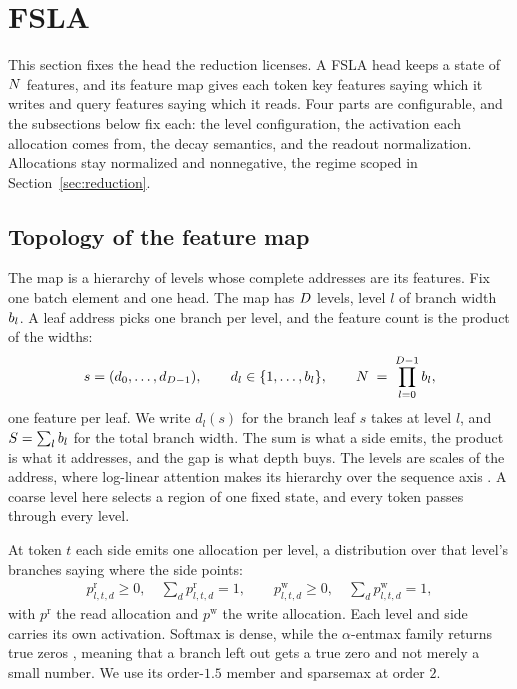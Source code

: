 \section{FSLA}
\label{sec:fsla}

This section fixes the head the reduction licenses. A FSLA head keeps a state of $N$ features, and its feature map gives each token key features saying which it writes and query features saying which it reads. Four parts are configurable, and the subsections below fix each: the level configuration, the activation each allocation comes from, the decay semantics, and the readout normalization. Allocations stay normalized and nonnegative, the regime scoped in Section~\ref{sec:reduction}.

\subsection{Topology of the feature map}
\label{sec:topology}

The map is a hierarchy of levels whose complete addresses are its features. Fix one batch element and one head. The map has $D$ levels, level $l$ of branch width $b_l$. A leaf address picks one branch per level, and the feature count is the product of the widths:
\begin{align}
  s = (d_0, \dots, d_{D-1}), \qquad d_l \in \{1,\dots,b_l\},
  \qquad N \;=\; \prod_{l=0}^{D-1} b_l ,
  \label{eq:leafcount}
\end{align}
one feature per leaf. We write $d_l(s)$ for the branch leaf $s$ takes at level $l$, and $S = \sum_l b_l$ for the total branch width. The sum is what a side emits, the product is what it addresses, and the gap is what depth buys. The levels are scales of the address, where log-linear attention makes its hierarchy over the sequence axis \citep{guo2025loglinear}. A coarse level here selects a region of one fixed state, and every token passes through every level.

At token $t$ each side emits one allocation per level, a distribution over that level's branches saying where the side points:
\begin{align}
  p^{\mathrm{r}}_{l,t,d} \ge 0,\quad \textstyle\sum_d p^{\mathrm{r}}_{l,t,d} = 1,
  \qquad
  p^{\mathrm{w}}_{l,t,d} \ge 0,\quad \textstyle\sum_d p^{\mathrm{w}}_{l,t,d} = 1,
  \label{eq:levelalloc}
\end{align}
with $p^{\mathrm{r}}$ the read allocation and $p^{\mathrm{w}}$ the write allocation. Each level and side carries its own activation. Softmax is dense, while the $\alpha$-entmax family returns true zeros \citep{peters2019sparse, martins2016sparsemax}, meaning that a branch left out gets a true zero and not merely a small number. We use its order-$1.5$ member and sparsemax at order $2$.

